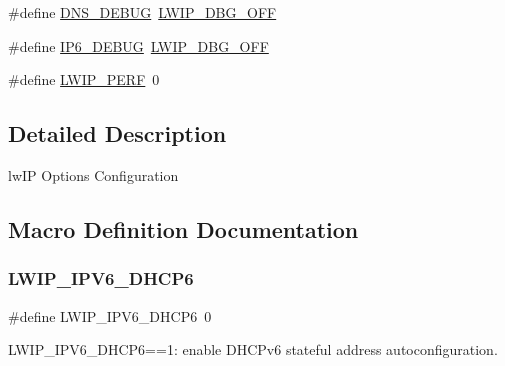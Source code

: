 \begin{DoxyCompactItemize}
\item 
\#define \hyperlink{group__lwip__opts__debugmsg_gaba55da2352c99d813767913e5e36be1f}{D\+N\+S\+\_\+\+D\+E\+B\+UG}~\hyperlink{group__debugging__levels_gadab1cdc3f45939a3a5c9a3d7e04987e1}{L\+W\+I\+P\+\_\+\+D\+B\+G\+\_\+\+O\+FF}
\item 
\#define \hyperlink{group__lwip__opts__debugmsg_gac2f9726756b78d4d7c425b0422a776ce}{I\+P6\+\_\+\+D\+E\+B\+UG}~\hyperlink{group__debugging__levels_gadab1cdc3f45939a3a5c9a3d7e04987e1}{L\+W\+I\+P\+\_\+\+D\+B\+G\+\_\+\+O\+FF}
\item 
\#define \hyperlink{group__lwip__opts__perf_ga44acd95b33e2d58a74455279721298de}{L\+W\+I\+P\+\_\+\+P\+E\+RF}~0
\end{DoxyCompactItemize}


\subsection{Detailed Description}
lw\+IP Options Configuration 

\subsection{Macro Definition Documentation}
\mbox{\label{openmote-cc2538_2lwip_2src_2include_2lwip_2opt_8h_a1ba67b6665026ec0c688dc4b0df047a6}} 
\subsubsection{\texorpdfstring{L\+W\+I\+P\+\_\+\+I\+P\+V6\+\_\+\+D\+H\+C\+P6}{LWIP\_IPV6\_DHCP6}}
{\footnotesize\ttfamily \#define L\+W\+I\+P\+\_\+\+I\+P\+V6\+\_\+\+D\+H\+C\+P6~0}

L\+W\+I\+P\+\_\+\+I\+P\+V6\+\_\+\+D\+H\+C\+P6==1\+: enable D\+H\+C\+Pv6 stateful address autoconfiguration. 